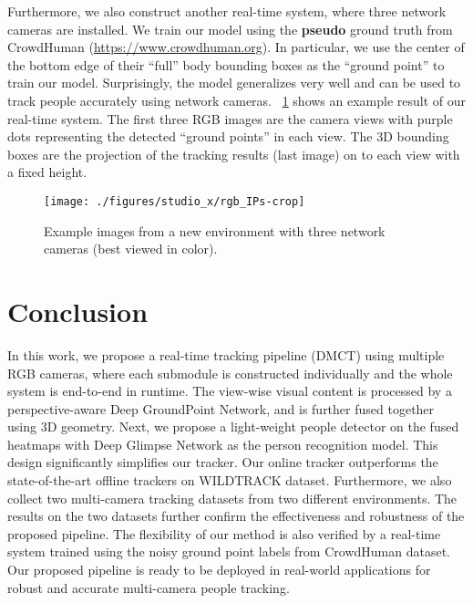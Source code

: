 \documentclass{article}
\begin{document}
Furthermore, we also construct another real-time system, where three network cameras are installed. 
We train our model using the \textbf{pseudo} ground truth from CrowdHuman (\url{https://www.crowdhuman.org}).
In particular, we use the center of the bottom edge of their ``full'' body bounding boxes as the ``ground point'' to train our model.
Surprisingly, the model generalizes very well and can be used to track people accurately using network cameras. \figurename{~\ref{fig:studiox:ips}} shows an example result of our real-time system.
The first three RGB images are the camera views with purple dots representing the detected ``ground points'' in each view. The 3D bounding boxes
are the projection of the tracking results (last image) on to each view with a fixed height.




\begin{figure}[!htbp]
	\begin{center}
			\texttt{[image: ./figures/studio\_x/rgb\_IPs-crop]}
	\end{center}
	\caption{Example images from a new environment with three network cameras (best viewed in color).}
	\label{fig:studiox:ips}
\end{figure}


\section{Conclusion}
In this work, we propose a real-time tracking pipeline (DMCT) using multiple RGB cameras, where each submodule is constructed
individually and the whole system is end-to-end in runtime.
The view-wise visual content is processed by a perspective-aware Deep GroundPoint Network, and is further fused together using 3D geometry.
Next, we propose a light-weight people detector on the fused heatmaps with Deep Glimpse Network as the person recognition model.
This design significantly simplifies our tracker. Our online tracker outperforms the state-of-the-art offline trackers on WILDTRACK dataset.
Furthermore, we also collect two multi-camera tracking datasets from two different environments.
The results on the two datasets further confirm the effectiveness and robustness of the proposed pipeline.
The flexibility of our method is also verified by a real-time system trained using the noisy ground point labels from CrowdHuman dataset.
Our proposed pipeline is ready to be deployed in real-world applications for robust and accurate multi-camera people tracking.

\clearpage


\end{document}
